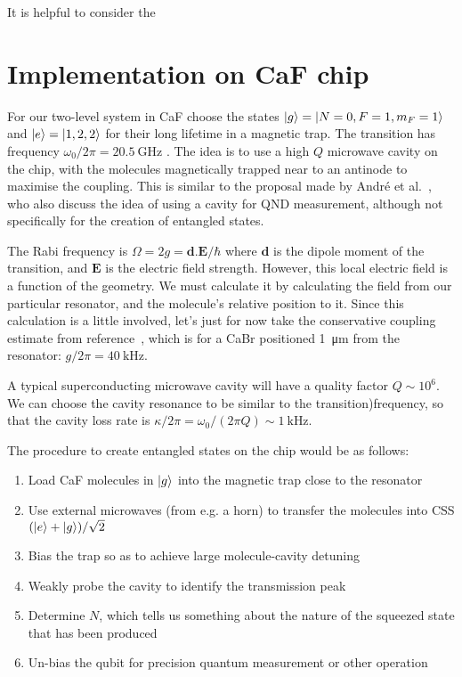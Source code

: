 \documentclass{article}
\begin{document}

It is helpful to consider the 

\section{Implementation on CaF chip}

For our two-level system in CaF choose the states $\ket{g} = \ket{N=0, F=1,
m_F=1}$ and $\ket{e} = \ket{1, 2, 2}$ for their long lifetime in a magnetic
trap. The transition has frequency $\omega_0/2\pi = \SI{20.5}{\giga\hertz}$
\cite{Williams2018}. The idea is to use a high $Q$ microwave cavity on the
chip, with the molecules magnetically trapped near to an antinode to maximise
the coupling. This is similar to the proposal made by Andr\'e et
al.~\cite{Andre2006}, who also discuss the idea of using a cavity for QND
measurement, although not specifically for the creation of entangled states.

The Rabi frequency is $\Omega = 2g = \mathbf{d}.\mathbf{E}/\hbar$ where $\mathbf{d}$
is the dipole moment of the transition, and $\mathbf{E}$ is the electric field
strength. However, this local electric field is a function of the geometry. We
must calculate it by calculating the field from our particular resonator, and
the molecule's relative position to it. Since this calculation is a little
involved, let's just for now take the conservative coupling estimate from
reference~\cite{Andre2006}, which is for a CaBr positioned
\SI{1}{\micro\meter} from the resonator: $g/2\pi = \SI{40}{\kilo\hertz}$.

A typical superconducting microwave cavity will have a quality factor
$Q\sim10^6$. We can choose the cavity resonance to be similar to the
transition)frequency, so that the cavity loss rate is $\kappa/2\pi =
\omega_0/(2\pi Q) \sim \SI{1}{\kilo\hertz}$. 

The procedure to create entangled states on the chip would be as follows:

\begin{enumerate}
  \item Load CaF molecules in $\ket{g}$ into the magnetic trap close to the
    resonator
  \item Use external microwaves (from e.g. a horn) to transfer the molecules
    into CSS $(\ket{e} + \ket{g})/\sqrt{2}$
  \item Bias the trap so as to achieve large molecule-cavity detuning
  \item Weakly probe the cavity to identify the transmission peak
  \item Determine $N$, which tells us something about the nature of the
    squeezed state that has been produced
  \item Un-bias the qubit for precision quantum measurement or other operation
\end{enumerate}
\end{document}
